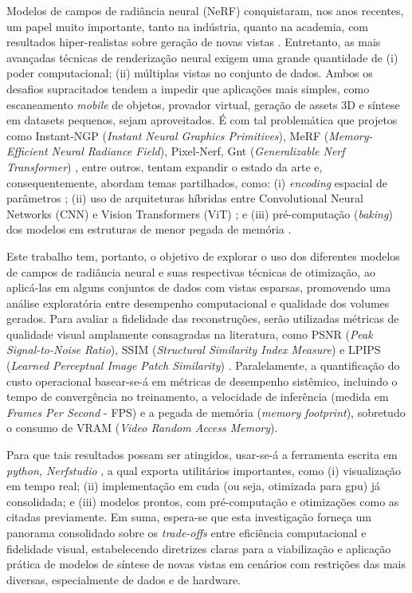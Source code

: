 \documentclass[12pt]{article}
\begin{document}
Modelos de campos de radiância neural (NeRF) conquistaram, nos anos recentes, um papel muito importante, tanto na indústria, quanto na academia, com resultados hiper-realistas sobre geração de novas vistas \cite{kerbl3Dgaussians, Tancik2023, substance3dviewer}. Entretanto, as mais avançadas técnicas de renderização neural exigem uma grande quantidade de (i) poder computacional; (ii) múltiplas vistas no conjunto de dados. Ambos os desafios supracitados tendem a impedir que aplicações mais simples, como escaneamento \textit{mobile} de objetos, provador virtual, geração de assets 3D e síntese em datasets pequenos, sejam aproveitados. É com tal problemática que projetos como Instant-NGP (\textit{Instant Neural Graphics Primitives}), MeRF (\textit{Memory-Efficient Neural Radiance Field}), Pixel-Nerf, Gnt (\textit{Generalizable Nerf Transformer}) \cite{muller2022, reiser2023merf, yu2021pixelnerfneuralradiancefields, t2023attentionnerfneeds}, entre outros, tentam expandir o estado da arte e, consequentemente, abordam temas partilhados, como: (i) \textit{encoding} espacial de parâmetros \cite{muller2022, reiser2023merf}; (ii) uso de arquiteturas híbridas entre Convolutional Neural Networks (CNN) e Vision Transformers (ViT) \cite{schwarz2021grafgenerativeradiancefields, wu2021cvt, t2023attentionnerfneeds}; e (iii) pré-computação (\textit{baking}) dos modelos em estruturas de menor pegada de memória \cite{reiser2023merf, hedman2021bakingneuralradiancefields}.

Este trabalho tem, portanto, o objetivo de explorar o uso dos diferentes modelos de campos de radiância neural e suas respectivas técnicas de otimização, ao aplicá-las em alguns conjuntos de dados com vistas esparsas, promovendo uma análise exploratória entre desempenho computacional e qualidade dos volumes gerados. Para avaliar a fidelidade das reconstruções, serão utilizadas métricas de qualidade visual amplamente consagradas na literatura, como PSNR (\textit{Peak Signal-to-Noise Ratio}), SSIM (\textit{Structural Similarity Index Measure}) \cite{wang2004image} e LPIPS (\textit{Learned Perceptual Image Patch Similarity}) \cite{zhang2018unreasonable}. Paralelamente, a quantificação do custo operacional basear-se-á em métricas de desempenho sistêmico, incluindo o tempo de convergência no treinamento, a velocidade de inferência (medida em \textit{Frames Per Second} - FPS) e a pegada de memória (\textit{memory footprint}), sobretudo o consumo de VRAM (\textit{Video Random Access Memory}).

Para que tais resultados possam ser atingidos, usar-se-á a ferramenta escrita em \textit{python, Nerfstudio} \cite{Tancik2023}, a qual exporta utilitários importantes, como (i) visualização em tempo real; (ii) implementação em cuda (ou seja, otimizada para gpu) já consolidada; e (iii) modelos prontos, com pré-computação e otimizações como as citadas previamente. Em suma, espera-se que esta investigação forneça um panorama consolidado sobre os \textit{trade-offs} entre eficiência computacional e fidelidade visual, estabelecendo diretrizes claras para a viabilização e aplicação prática de modelos de síntese de novas vistas em cenários com restrições das mais diversas, especialmente de dados e de hardware.
\end{document}
